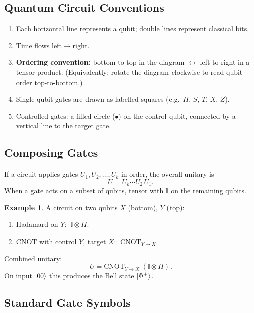\documentclass[11pt]{article}
\theoremstyle{definition}
\newtheorem{example}{Example}[section]
\begin{document}
\subsection{Quantum Circuit Conventions}

\begin{enumerate}
    \item Each horizontal line represents a qubit; double lines represent classical bits.
    \item Time flows left$\to$right.
    \item \textbf{Ordering convention:} bottom-to-top in the diagram $\leftrightarrow$ left-to-right in a tensor product.  (Equivalently: rotate the diagram clockwise to read qubit order top-to-bottom.)
    \item Single-qubit gates are drawn as labelled squares (e.g.\ $H$, $S$, $T$, $X$, $Z$).
    \item Controlled gates: a filled circle ($\bullet$) on the control qubit, connected by a vertical line to the target gate.
\end{enumerate}

\subsection{Composing Gates}

If a circuit applies gates $U_1,U_2,\dots,U_k$ in order, the overall unitary is
\[
    U = U_k \cdots U_2\,U_1.
\]
When a gate acts on a subset of qubits, tensor with $\mathbb{I}$ on the remaining qubits.

\begin{example}
A circuit on two qubits $X$ (bottom), $Y$ (top):
\begin{enumerate}
    \item Hadamard on $Y$: $\;\mathbb{I}\otimes H$.
    \item CNOT with control $Y$, target $X$: $\;\mathrm{CNOT}_{Y\to X}$.
\end{enumerate}
Combined unitary:
\[
    U = \mathrm{CNOT}_{Y\to X}\;(\mathbb{I}\otimes H).
\]
On input $\ket{00}$ this produces the Bell state $\ket{\Phi^+}$.
\end{example}

\subsection{Standard Gate Symbols}
\end{document}
